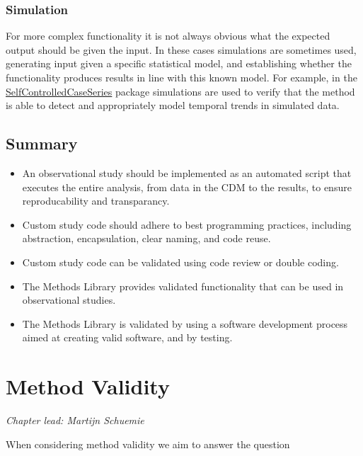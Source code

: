\documentclass[11pt]{book}
\theoremstyle{definition}
\theoremstyle{definition}
\theoremstyle{definition}
\theoremstyle{remark}
\let\BeginKnitrBlock\begin \let\EndKnitrBlock\end
\begin{document}
\hypertarget{simulation}{%
\subsection{Simulation}\label{simulation}}

For more complex functionality it is not always obvious what the expected output should be given the input. In these cases simulations are sometimes used, generating input given a specific statistical model, and establishing whether the functionality produces results in line with this known model. For example, in the \href{https://ohdsi.github.io/SelfControlledCaseSeries/}{SelfControlledCaseSeries} package simulations are used to verify that the method is able to detect and appropriately model temporal trends in simulated data.

\hypertarget{summary-12}{%
\section{Summary}\label{summary-12}}

\BeginKnitrBlock{rmdsummary}
\begin{itemize}
\item
  An observational study should be implemented as an automated script that executes the entire analysis, from data in the CDM to the results, to ensure reproducability and transparancy.
\item
  Custom study code should adhere to best programming practices, including abstraction, encapsulation, clear naming, and code reuse.
\item
  Custom study code can be validated using code review or double coding.
\item
  The Methods Library provides validated functionality that can be used in observational studies.
\item
  The Methods Library is validated by using a software development process aimed at creating valid software, and by testing.
\end{itemize}
\EndKnitrBlock{rmdsummary}

\hypertarget{MethodValidity}{%
\chapter{Method Validity}\label{MethodValidity}}

\emph{Chapter lead: Martijn Schuemie}

When considering method validity we aim to answer the question
\end{document}
